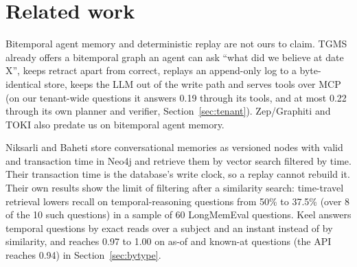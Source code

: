 \documentclass{article}
\begin{document}
\section{Related work}
\label{sec:related}

Bitemporal agent memory and deterministic replay are not ours to claim. TGMS \cite{tgms} already offers a bitemporal graph an agent can ask ``what did we believe at date X'', keeps retract apart from correct, replays an append-only log to a byte-identical store, keeps the LLM out of the write path and serves tools over MCP (on our tenant-wide questions it answers 0.19 through its tools, and at most 0.22 through its own planner and verifier, Section~\ref{sec:tenant}). Zep/Graphiti \cite{zep} and TOKI \cite{toki} also predate us on bitemporal agent memory.

Niksarli and Baheti \cite{niksarli} store conversational memories as versioned nodes with valid and transaction time in Neo4j and retrieve them by vector search filtered by time. Their transaction time is the database's write clock, so a replay cannot rebuild it. Their own results show the limit of filtering after a similarity search: time-travel retrieval lowers recall on temporal-reasoning questions from 50\% to 37.5\% (over 8 of the 10 such questions) in a sample of 60 LongMemEval \cite{longmemeval} questions. Keel answers temporal questions by exact reads over a subject and an instant instead of by similarity, and reaches 0.97 to 1.00 on as-of and known-at questions (the API reaches 0.94) in Section~\ref{sec:bytype}.
\end{document}
